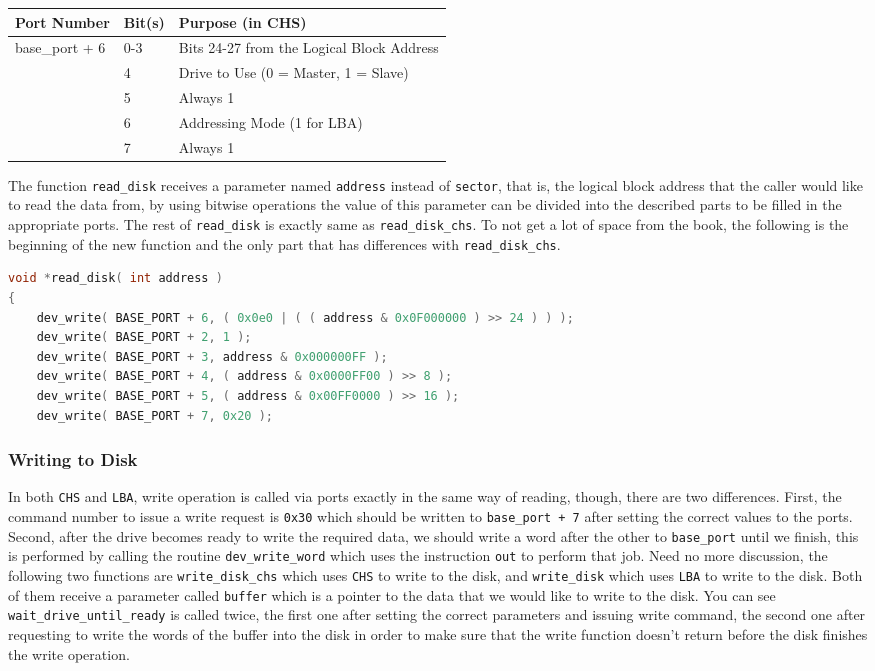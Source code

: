 \begin{longtable}[]{@{}lll@{}}
\toprule
Port Number & Bit(s) & Purpose (in CHS)\tabularnewline
\midrule
\endhead
base\_port + 6 & 0-3 & Bits 24-27 from the Logical Block
Address\tabularnewline
& 4 & Drive to Use (0 = Master, 1 = Slave)\tabularnewline
& 5 & Always 1\tabularnewline
& 6 & Addressing Mode (1 for LBA)\tabularnewline
& 7 & Always 1\tabularnewline
\bottomrule
\end{longtable}

The function \lstinline!read_disk! receives a parameter named
\lstinline!address! instead of \lstinline!sector!, that is, the logical
block address that the caller would like to read the data from, by using
bitwise operations the value of this parameter can be divided into the
described parts to be filled in the appropriate ports. The rest of
\lstinline!read_disk! is exactly same as \lstinline!read_disk_chs!. To
not get a lot of space from the book, the following is the beginning of
the new function and the only part that has differences with
\lstinline!read_disk_chs!.

\begin{lstlisting}[language=C]
void *read_disk( int address )
{
    dev_write( BASE_PORT + 6, ( 0x0e0 | ( ( address & 0x0F000000 ) >> 24 ) ) );
    dev_write( BASE_PORT + 2, 1 );
    dev_write( BASE_PORT + 3, address & 0x000000FF );
    dev_write( BASE_PORT + 4, ( address & 0x0000FF00 ) >> 8 );
    dev_write( BASE_PORT + 5, ( address & 0x00FF0000 ) >> 16 );
    dev_write( BASE_PORT + 7, 0x20 ); 
\end{lstlisting}

\subsubsection{Writing to Disk}\label{writing-to-disk}

In both \lstinline!CHS! and \lstinline!LBA!, write operation is called
via ports exactly in the same way of reading, though, there are two
differences. First, the command number to issue a write request is
\lstinline!0x30! which should be written to \lstinline!base_port + 7!
after setting the correct values to the ports. Second, after the drive
becomes ready to write the required data, we should write a word after
the other to \lstinline!base_port! until we finish, this is performed by
calling the routine \lstinline!dev_write_word! which uses the
instruction \lstinline!out! to perform that job. Need no more
discussion, the following two functions are \lstinline!write_disk_chs!
which uses \lstinline!CHS! to write to the disk, and
\lstinline!write_disk! which uses \lstinline!LBA! to write to the disk.
Both of them receive a parameter called \lstinline!buffer! which is a
pointer to the data that we would like to write to the disk. You can see
\lstinline!wait_drive_until_ready! is called twice, the first one after
setting the correct parameters and issuing write command, the second one
after requesting to write the words of the buffer into the disk in order
to make sure that the write function doesn't return before the disk
finishes the write operation.

